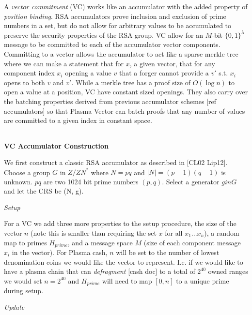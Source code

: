 \documentclass[11pt]{article}
\begin{document}
A \textit{vector commitment} (VC) works like an accumulator with the added property of \textit{position binding}. RSA accumulators prove inclusion and exclusion of prime numbers in a set, but do not allow for arbitrary values to be accumulated to preserve the security properties of the RSA group. VC allow for an $M$-bit $\{0,1\}^\lambda$ message to be committed to each of the accumulator vector components. Committing to a vector allows the accumulator to act like a sparse merkle tree where we can make a statement that for $x$, a given vector, that for any component index $x_i$ opening a value $v$ that a forger cannot provide a $v'$ s.t. $x_i$ opens to both $v$ and $v'$. While a merkle tree has a proof size of $O(\log n)$ to open a value at a position, VC have constant sized openings. They also carry over the batching properties derived from previous accumulator schemes [ref accumulators] so that Plasma Vector can batch proofs that any number of values are committed to a given index in constant space.
\\
\\

\centerline{\textbf{VC Accumulator Construction}}

We first construct a classic RSA accumulator as described in [CL02 Lip12]. Choose a group $G$ in ${Z/ZN}^*$ where $N=pq$ and $|N| = (p-1)(q-1)$ is unknown. $pq$ are two 1024 bit prime numbers $(p,q)$. Select a generator $g in G$ and let the CRS be (N, g).
\\

\centerline{\textit{Setup}}

For a VC we add three more properties to the setup procedure, the size of the vector $n$ (note this is smaller than requiring the set $x$ for all $x_1...x_n$), a random map to primes $H_{prime}$, and a message space $M$ (size of each component message $x_i$ in the vector). For Plasma cash, $n$ will be set to the number of lowest denomination coins we would like the vector to represent. I.e. if we would like to have a plasma chain that can \textit{defragment} [cash doc] to a total of $2^{40}$ owned ranges we would set $n=2^{40}$ and $H_{prime}$ will need to map $[0,n]$ to a unique prime during setup.
\\

\centerline{\textit{Update}}
\end{document}
